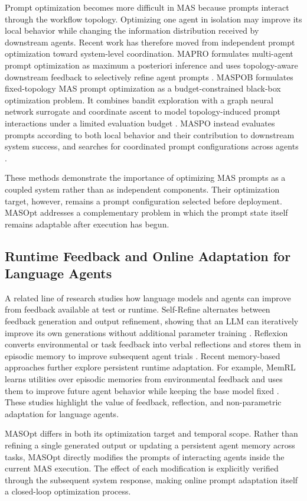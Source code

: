 Prompt optimization becomes more difficult in MAS because prompts interact through the workflow topology.
Optimizing one agent in isolation may improve its local behavior while changing the information distribution received by downstream agents.
Recent work has therefore moved from independent prompt optimization toward system-level coordination.
MAPRO formulates multi-agent prompt optimization as maximum a posteriori inference and uses topology-aware downstream feedback to selectively refine agent prompts
\citep{mapro2026}.
MASPOB formulates fixed-topology MAS prompt optimization as a budget-constrained black-box optimization problem.
It combines bandit exploration with a graph neural network surrogate and coordinate ascent to model topology-induced prompt interactions under a limited evaluation budget
\citep{hong2026maspob}.
MASPO instead evaluates prompts according to both local behavior and their contribution to downstream system success, and searches for coordinated prompt configurations across agents
\citep{wang2026maspo}.

These methods demonstrate the importance of optimizing MAS prompts as a coupled system rather than as independent components.
Their optimization target, however, remains a prompt configuration selected before deployment.
MASOpt addresses a complementary problem in which the prompt state itself remains adaptable after execution has begun.


\subsection{Runtime Feedback and Online Adaptation for Language Agents}

A related line of research studies how language models and agents can improve from feedback available at test or runtime.
Self-Refine alternates between feedback generation and output refinement, showing that an LLM can iteratively improve its own generations without additional parameter training
\citep{madaan2023selfrefine,pan2024critic}.
Reflexion converts environmental or task feedback into verbal reflections and stores them in episodic memory to improve subsequent agent trials
\citep{shinn2023reflexion,yao2023react}.
Recent memory-based approaches further explore persistent runtime adaptation.
For example, MemRL learns utilities over episodic memories from environmental feedback and uses them to improve future agent behavior while keeping the base model fixed
\citep{zhang2026memrl}.
These studies highlight the value of feedback, reflection, and non-parametric adaptation for language agents.

MASOpt differs in both its optimization target and temporal scope.
Rather than refining a single generated output or updating a persistent agent memory across tasks, MASOpt directly modifies the prompts of interacting agents inside the current MAS execution.
The effect of each modification is explicitly verified through the subsequent system response, making online prompt adaptation itself a closed-loop optimization process.
